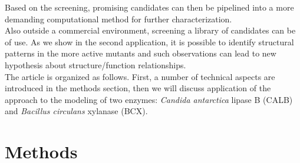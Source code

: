Based on the screening, promising candidates can then be pipelined into a more demanding computational method for further characterization.\\
Also outside a commercial environment, screening a library of candidates can be of use.
As we show in the second application, it is possible to identify structural patterns in the more active mutants and such observations can lead to new hypothesis about structure/function relationships.\\
The article is organized as follows.
First, a number of technical aspects are introduced in the methods section, then we will discuss application of the approach to the modeling of two enzymes: \textit{Candida antarctica} lipase B (CALB) and \textit{Bacillus circulans} xylanase (BCX).




\section{Methods}\label{sec:methods}

